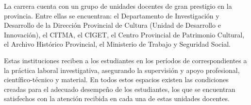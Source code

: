 La carrera cuenta con un grupo de unidades docentes de gran prestigio en la provincia. Entre ellas se encuentran: el Departamento de Investigación y Desarrollo de la Dirección Provincial de Cultura (Unidad de Desarrollo e Innovación), el CITMA, el CIGET, el Centro Provincial de Patrimonio Cultural, el Archivo Histórico Provincial, el Ministerio de Trabajo y Seguridad Social.

Estas instituciones reciben a los estudiantes en los períodos de correspondientes a la práctica laboral investigativa, asegurando la supervisión y apoyo profesional, científico-técnico y material. En todos estos espacios existen las condiciones creadas para el adecuado desempeño de los estudiantes, los que se encuentran satisfechos con la atención recibida en cada una de estas unidades docentes.